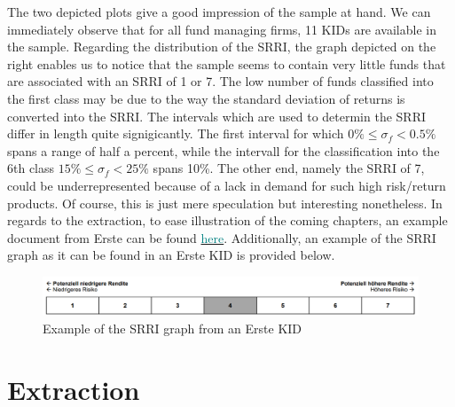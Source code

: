 \documentclass[aodsor,preprint]{imsart}
\numberwithin{equation}{section}
\theoremstyle{plain}
\begin{document}
The two depicted plots give a good impression of the sample at hand. We can immediately observe that for all fund managing firms, 11 KIDs are available in the sample. Regarding the distribution of the SRRI, the graph depicted on the right enables us to notice that the sample seems to contain very little funds that are associated with an SRRI of 1 or 7. The low number of funds classified into the first class may be due to the way the standard deviation of returns is converted into the SRRI. The intervals which are used to determin the SRRI differ in length quite signigicantly. The first interval for which $0\% \leq\sigma_f<0.5\%$ spans a range of half a percent, while the intervall for the classification into the 6th class $15\%\leq\sigma_f<25\%$ spans 10\%. The other end, namely the SRRI of 7, could be underrepresented because of a lack in demand for such high risk/return products. Of course, this is just mere speculation but interesting nonetheless.
In regards to the extraction, to ease illustration of the coming chapters, an example document from Erste can be found \href{https://github.com/Base-R-Best-R/KID/blob/main/KIDs/Erste/kid-eb-147-t2957-at_de-de_en_4.pdf}{\textcolor{teal}{here}}. Additionally, an example of the SRRI graph as it can be found in an Erste KID is provided below.

\begin{figure}[H]
	\includegraphics[width = 12cm]{example_SRRI_graph}
	\caption{Example of the SRRI graph from an Erste KID}
\end{figure}


\section{Extraction}
\end{document}
